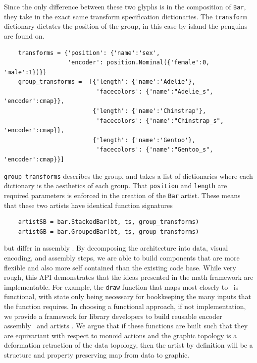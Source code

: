 \documentclass[../main.tex]{subfiles}
\begin{document}
Since the only difference between these two glyphs is in the composition of \texttt{Bar}, they take in the exact same transform specification dictionaries. The \texttt{transform} dictionary dictates the position of the group, in this case by island the penguins are found on.

\begin{verbatim}
    transforms = {'position': {'name':'sex',
                  'encoder': position.Nominal({'female':0, 'male':1})}} 
    group_transforms =  [{'length': {'name':'Adelie'},
                          'facecolors': {'name':"Adelie_s", 'encoder':cmap}},
                         {'length': {'name':'Chinstrap'},
                          'facecolors': {'name':"Chinstrap_s", 'encoder':cmap}}, 
                         {'length': {'name':'Gentoo'},
                          'facecolors': {'name':"Gentoo_s", 'encoder':cmap}}]
    \end{verbatim}
    \texttt{group_transforms} describes the group, and takes a list of dictionaries where each dictionary is the aesthetics of each group. That \texttt{position} and \texttt{length} are required parameters is enforced in the creation of the \texttt{Bar} artist. These means that these two artists have identical function signatures
    
    \begin{verbatim}
    artistSB = bar.StackedBar(bt, ts, group_transforms)
    artistGB = bar.GroupedBar(bt, ts, group_transforms)
    \end{verbatim}
    
    but differ in assembly \vmarkd. By decomposing the architecture into data, visual encoding, and assembly steps, we are able to build components that are more flexible and also more self contained than the existing code base. While very rough, this API demonstrates that the ideas presented in the math framework are implementable. For example, the \texttt{draw} function that maps most closely to \vartist\ is functional, with state only being necessary for bookkeeping the many inputs that the function requires. In choosing a functional approach, if not implementation, we provide a framework for library developers to build reusable encoder \vchannel\, assembly \vmarkd\ and artists \vartist. We argue that  if these functions are built such that they are equivariant with respect to monoid actions and the graphic topology is a deformation retraction of the data topology, then the artist by definition will be a structure and property preserving map from data to graphic. 
\end{document}
